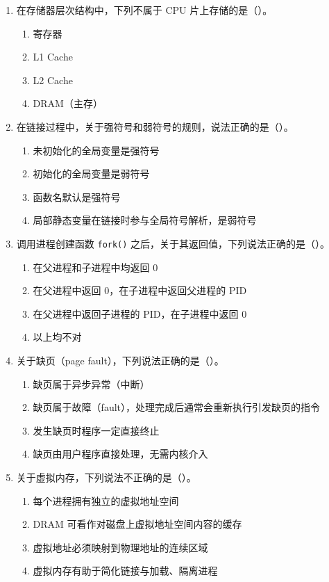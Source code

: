 \documentclass[11pt,a4paper]{ctexart}
\begin{document}
\begin{enumerate}
\item 在存储器层次结构中，下列不属于 CPU 片上存储的是（\hspace{1.2em}）。
\begin{enumerate}[label=\Alph*.,itemsep=0.1em]
  \item 寄存器
  \item L1 Cache
  \item L2 Cache
  \item DRAM（主存）
\end{enumerate}

\item 在链接过程中，关于强符号和弱符号的规则，说法正确的是（\hspace{1.2em}）。
\begin{enumerate}[label=\Alph*.,itemsep=0.1em]
  \item 未初始化的全局变量是强符号
  \item 初始化的全局变量是弱符号
  \item 函数名默认是强符号
  \item 局部静态变量在链接时参与全局符号解析，是弱符号
\end{enumerate}

\item 调用进程创建函数 \texttt{fork()} 之后，关于其返回值，下列说法正确的是（\hspace{1.2em}）。
\begin{enumerate}[label=\Alph*.,itemsep=0.1em]
  \item 在父进程和子进程中均返回 0
  \item 在父进程中返回 0，在子进程中返回父进程的 PID
  \item 在父进程中返回子进程的 PID，在子进程中返回 0
  \item 以上均不对
\end{enumerate}

\item 关于缺页（page fault），下列说法正确的是（\hspace{1.2em}）。
\begin{enumerate}[label=\Alph*.,itemsep=0.1em]
  \item 缺页属于异步异常（中断）
  \item 缺页属于故障（fault），处理完成后通常会重新执行引发缺页的指令
  \item 发生缺页时程序一定直接终止
  \item 缺页由用户程序直接处理，无需内核介入
\end{enumerate}

\item 关于虚拟内存，下列说法不正确的是（\hspace{1.2em}）。
\begin{enumerate}[label=\Alph*.,itemsep=0.1em]
  \item 每个进程拥有独立的虚拟地址空间
  \item DRAM 可看作对磁盘上虚拟地址空间内容的缓存
  \item 虚拟地址必须映射到物理地址的连续区域
  \item 虚拟内存有助于简化链接与加载、隔离进程
\end{enumerate}


\end{enumerate}
\end{document}
